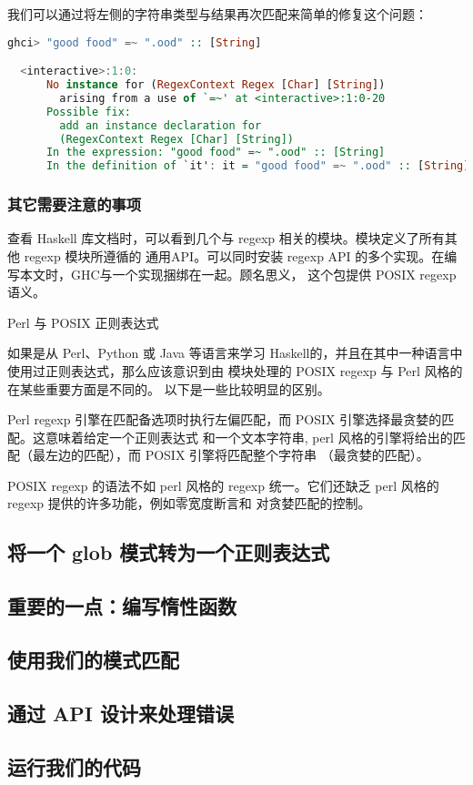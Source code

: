 \documentclass[./main.tex]{subfiles}
\begin{document}
我们可以通过将左侧的字符串类型与结果再次匹配来简单的修复这个问题：

\begin{lstlisting}[language=Haskell]
  ghci> "good food" =~ ".ood" :: [String]

  <interactive>:1:0:
      No instance for (RegexContext Regex [Char] [String])
        arising from a use of `=~' at <interactive>:1:0-20
      Possible fix:
        add an instance declaration for
        (RegexContext Regex [Char] [String])
      In the expression: "good food" =~ ".ood" :: [String]
      In the definition of `it': it = "good food" =~ ".ood" :: [String]
\end{lstlisting}

\subsubsection*{其它需要注意的事项}

查看 Haskell 库文档时，可以看到几个与 regexp 相关的模块。模块定义了所有其他 regexp 模块所遵循的
通用API。可以同时安装 regexp API 的多个实现。在编写本文时，GHC与一个实现捆绑在一起。顾名思义，
这个包提供 POSIX regexp 语义。

\begin{anote}
  Perl 与 POSIX 正则表达式

  如果是从 Perl、Python 或 Java 等语言来学习 Haskell的，并且在其中一种语言中使用过正则表达式，那么应该意识到由
  模块处理的 POSIX regexp 与 Perl 风格的在某些重要方面是不同的。
  以下是一些比较明显的区别。

  Perl regexp 引擎在匹配备选项时执行左偏匹配，而 POSIX 引擎选择最贪婪的匹配。这意味着给定一个正则表达式
  和一个文本字符串, perl 风格的引擎将给出的匹配（最左边的匹配），而 POSIX 引擎将匹配整个字符串
  （最贪婪的匹配）。

  POSIX regexp 的语法不如 perl 风格的 regexp 统一。它们还缺乏 perl 风格的 regexp 提供的许多功能，例如零宽度断言和
  对贪婪匹配的控制。
\end{anote}

\subsection*{将一个 glob 模式转为一个正则表达式}

\subsection*{重要的一点：编写惰性函数}

\subsection*{使用我们的模式匹配}

\subsection*{通过 API 设计来处理错误}

\subsection*{运行我们的代码}
\end{document}
